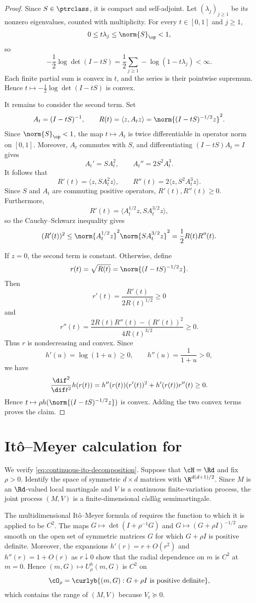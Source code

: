 \documentclass[11pt]{article}
\let\cref\zcref
\begin{document}
\begin{proof}
Since $S\in\ptrclass$, it is compact and self-adjoint. Let $(\lambda_j)_{j\geq1}$ be its nonzero eigenvalues, counted with multiplicity. For every $t\in[0,1]$ and $j\geq1$,
\[
  0\leq t\lambda_j\leq\norm{S}_{\op}<1,
\]
so
\[
  -\frac12\log\det(I-tS)=\frac12\sum_{j\geq1}-\log(1-t\lambda_j)<\infty.
\]
Each finite partial sum is convex in $t$, and the series is their pointwise supremum. Hence $t\mapsto-\frac12\log\det(I-tS)$ is convex.

It remains to consider the second term. Set
\[
  A_t=(I-tS)^{-1}, \qquad R(t)=\langle z,A_tz\rangle=\norm{(I-tS)^{-1/2}z}^2.
\]
Since $\norm{S}_{\op}<1$, the map $t\mapsto A_t$ is twice differentiable in operator norm on $[0,1]$. Moreover, $A_t$ commutes with $S$, and differentiating $(I-tS)A_t=I$ gives
\[
  A_t'=SA_t^2, \qquad A_t''=2S^2A_t^3.
\]
It follows that
\[
  R'(t)=\langle z,SA_t^2z\rangle, \qquad R''(t)=2\langle z,S^2A_t^3z\rangle.
\]
Since $S$ and $A_t$ are commuting positive operators, $R'(t),R''(t)\geq0$. Furthermore,
\[
  R'(t)=\langle A_t^{1/2}z,SA_t^{3/2}z\rangle,
\]
so the Cauchy--Schwarz inequality gives
\[
  (R'(t))^2
  \leq \norm{A_t^{1/2}z}^2\norm{SA_t^{3/2}z}^2
  =\frac12R(t)R''(t).
\]

If $z=0$, the second term is constant. Otherwise, define
\[
  r(t)=\sqrt{R(t)}=\norm{(I-tS)^{-1/2}z}.
\]
Then
\[
  r'(t)=\frac{R'(t)}{2R(t)^{1/2}}\geq0
\]
and
\[
  r''(t)=\frac{2R(t)R''(t)-(R'(t))^2}{4R(t)^{3/2}}\geq0.
\]
Thus $r$ is nondecreasing and convex. Since
\[
  h'(u)=\log(1+u)\geq0, \qquad h''(u)=\frac1{1+u}>0,
\]
we have
\[
  \frac{\dif^2}{\dif t^2}h(r(t))
  =h''(r(t))(r'(t))^2+h'(r(t))r''(t)
  \geq0.
\]
Hence $t\mapsto\rho h(\norm{(I-tS)^{-1/2}z})$ is convex. Adding the two convex terms proves the claim.
\end{proof}


\section{Itô--Meyer calculation for \cref{prop:continuous-bounded-jumps}}
\label{app:continuous-bounded-jumps}

We verify \eqref{eq:continuous-ito-decomposition}. Suppose that $\cH=\Rd$ and fix $\rho>0$. Identify the space of symmetric $d\times d$ matrices with $\R^{d(d+1)/2}$. Since $M$ is an $\Rd$-valued local martingale and $V$ is a continuous finite-variation process, the joint process $(M,V)$ is a finite-dimensional càdlàg semimartingale.

The multidimensional Itô--Meyer formula of \citet[Thm.~27.1]{metivier1982semimartingales} requires the function to which it is applied to be $C^2$. The maps $G\mapsto\det(I+\rho^{-1}G)$ and $G\mapsto(G+\rho I)^{-1/2}$ are smooth on the open set of symmetric matrices $G$ for which $G+\rho I$ is positive definite. Moreover, the expansions $h'(r)=r+O(r^2)$ and $h''(r)=1+O(r)$ as $r\downarrow0$ show that the radial dependence on $m$ is $C^2$ at $m=0$. Hence $(m,G)\mapsto U_\rho^h(m,G)$ is $C^2$ on
\[
  \cO_\rho=\curlyb{(m,G):G+\rho I\text{ is positive definite}},
\]
which contains the range of $(M,V)$ because $V_t\succeq0$.
\end{document}
